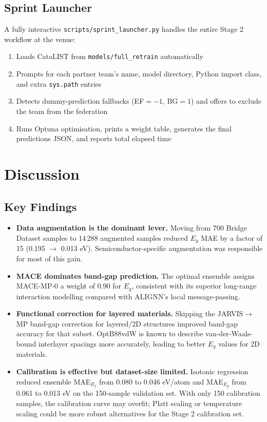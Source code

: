 \documentclass[10pt, a4paper]{article}
\begin{document}
\subsection{Sprint Launcher}

A fully interactive \texttt{scripts/sprint\_launcher.py} handles the
entire Stage 2 workflow at the venue:
\begin{enumerate}[nosep]
  \item Loads CataLIST from \texttt{models/full\_retrain} automatically
  \item Prompts for each partner team's name, model directory,
    Python import class, and extra \texttt{sys.path} entries
  \item Detects dummy-prediction fallbacks (EF$= -1$, BG$= 1$) and
    offers to exclude the team from the federation
  \item Runs Optuna optimisation, prints a weight table, generates the
    final predictions JSON, and reports total elapsed time
\end{enumerate}

\section{Discussion}

\subsection{Key Findings}

\begin{itemize}
  \item \textbf{Data augmentation is the dominant lever.}
    Moving from 700 Bridge Dataset samples to 14\,288 augmented samples
    reduced $E_g$ MAE by a factor of 15 (0.195 $\to$ 0.013 eV).
    Semiconductor-specific augmentation was responsible for most of
    this gain.

  \item \textbf{MACE dominates band-gap prediction.}
    The optimal ensemble assigns MACE-MP-0 a weight of 0.90 for $E_g$,
    consistent with its superior long-range interaction modelling
    compared with ALIGNN's local message-passing.

  \item \textbf{Functional correction for layered materials.}
    Skipping the JARVIS$\to$MP band-gap correction for layered/2D
    structures improved band-gap accuracy for that subset.
    OptB88vdW is known to describe van-der-Waals-bound interlayer
    spacings more accurately, leading to better $E_g$ values for 2D
    materials.

  \item \textbf{Calibration is effective but dataset-size limited.}
    Isotonic regression reduced ensemble MAE$_{E_f}$ from 0.080 to
    0.046 eV/atom and MAE$_{E_g}$ from 0.061 to 0.013 eV on the
    150-sample validation set.
    With only 150 calibration samples, the calibration curve may
    overfit; Platt scaling or temperature scaling could be more
    robust alternatives for the Stage 2 calibration set.
\end{itemize}
\end{document}
